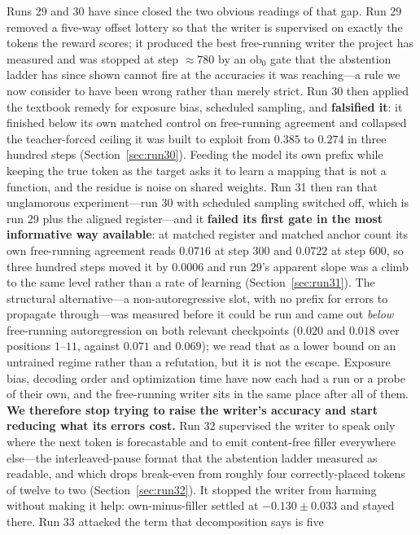 \documentclass{article} %
\begin{document}
Runs 29 and 30 have since closed the two obvious readings of that gap. Run 29 removed a five-way offset lottery so that the writer is supervised on exactly the tokens the reward scores; it produced the best free-running writer the project has measured and was stopped at step ${\approx}780$ by an $\mathrm{ob}_0$ gate that the abstention ladder has since shown cannot fire at the accuracies it was reaching---a rule we now consider to have been wrong rather than merely strict. Run 30 then applied the textbook remedy for exposure bias, scheduled sampling, and \textbf{falsified it}: it finished below its own matched control on free-running agreement and collapsed the teacher-forced ceiling it was built to exploit from $0.385$ to $0.274$ in three hundred steps (Section~\ref{sec:run30}). Feeding the model its own prefix while keeping the true token as the target asks it to learn a mapping that is not a function, and the residue is noise on shared weights. Run 31 then ran that unglamorous experiment---run 30 with scheduled sampling switched off, which is run 29
plus the aligned register---and it \textbf{failed its first gate in the most informative way available}: at
matched register and matched anchor count its own free-running agreement reads $0.0716$ at step $300$ and
$0.0722$ at step $600$, so three hundred steps moved it by $0.0006$ and run 29's apparent slope was a climb
to the same level rather than a rate of learning (Section~\ref{sec:run31}). The structural alternative---a
non-autoregressive slot, with no prefix for errors to propagate through---was measured before it could be run
and came out \emph{below} free-running autoregression on both relevant checkpoints ($0.020$ and $0.018$ over
positions $1$--$11$, against $0.071$ and $0.069$); we read that as a lower bound on an untrained regime
rather than a refutation, but it is not the escape. Exposure bias, decoding order and optimization time have
now each had a run or a probe of their own, and the free-running writer sits in the same place after all of
them. \textbf{We therefore stop trying to raise the writer's accuracy and start reducing what its errors
cost.} Run 32 supervised the writer to speak only where the next token is forecastable and to emit
content-free filler everywhere else---the interleaved-pause format that the abstention ladder measured as
readable, and which drops break-even from roughly four correctly-placed tokens of twelve to two
(Section~\ref{sec:run32}). It stopped the writer from harming without making it help: own-minus-filler
settled at $-0.130 \pm 0.033$ and stayed there. Run 33 attacked the term that decomposition says is five
\end{document}
